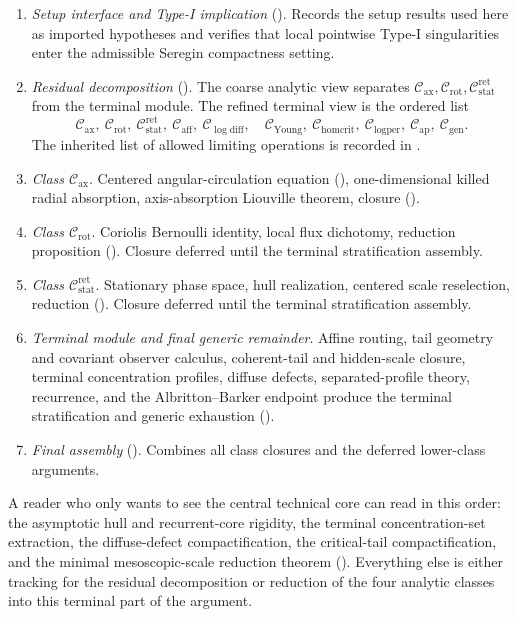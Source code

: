 \documentclass[11pt]{amsart}
\numberwithin{equation}{section}
\theoremstyle{plain}
\theoremstyle{definition}
\theoremstyle{remark}
\newcommand{\Cax}{\mathcal C_{\mathrm{ax}}}
\newcommand{\Crot}{\mathcal C_{\mathrm{rot}}}
\newcommand{\Cstat}{\mathcal C_{\mathrm{stat}}^{\mathrm{ret}}}
\newcommand{\Caff}{\mathcal C_{\mathrm{aff}}}
\newcommand{\Cgen}{\mathcal C_{\mathrm{gen}}}
\newcommand{\Chomcrit}{\mathcal C_{\mathrm{homcrit}}}
\newcommand{\Clogper}{\mathcal C_{\mathrm{logper}}}
\newcommand{\Capcrit}{\mathcal C_{\mathrm{ap}}}
\newcommand{\Cyoung}{\mathcal C_{\mathrm{Young}}}
\newcommand{\Clogdiff}{\mathcal C_{\log\mathrm{diff}}}
\begin{document}
\begin{enumerate}[label=\textup{(\arabic*)},leftmargin=2.2em]
   \item \emph{Setup interface and Type-I implication}
   (). Records the
   setup results used here as imported hypotheses and verifies that local pointwise
   Type-I singularities enter the admissible Seregin compactness setting.
   \item \emph{Residual decomposition} ().
   The coarse analytic view separates \(\Cax,\Crot,\Cstat\) from the terminal
   module.  The refined terminal view is the ordered list
   \[
      \Cax,\ \Crot,\ \Cstat,\ \Caff,\ \Clogdiff,\quad
      \Cyoung,\ \Chomcrit,\ \Clogper,\ \Capcrit,\ \Cgen .
   \]
   The inherited list of allowed limiting operations is recorded in
   .
   \item \emph{Class \(\Cax\)}. Centered angular-circulation equation
   (), one-dimensional killed radial
   absorption, axis-absorption Liouville theorem, closure
   ().
   \item \emph{Class \(\Crot\)}. Coriolis Bernoulli identity, local flux
   dichotomy, reduction proposition
   ().  Closure deferred until the terminal
   stratification assembly.
   \item \emph{Class \(\Cstat\)}. Stationary phase space, hull realization,
   centered scale reselection, reduction
   ().
   Closure deferred until the terminal stratification assembly.
   \item \emph{Terminal module and final generic remainder}.  Affine routing,
   tail geometry and covariant observer calculus, coherent-tail and
   hidden-scale closure, terminal concentration profiles, diffuse defects,
   separated-profile theory, recurrence, and the Albritton--Barker endpoint
   produce the terminal stratification and generic exhaustion
   ().
   \item \emph{Final assembly} (). Combines all
   class closures and the deferred lower-class arguments.
\end{enumerate}

A reader who only wants to see the central technical core can read in this
order: the asymptotic hull and recurrent-core rigidity, the terminal
concentration-set extraction, the diffuse-defect compactification, the
critical-tail compactification, and the minimal mesoscopic-scale reduction
theorem ().  Everything else is
either tracking for the residual decomposition or reduction of the four
analytic classes into this terminal part of the argument.
\end{document}
